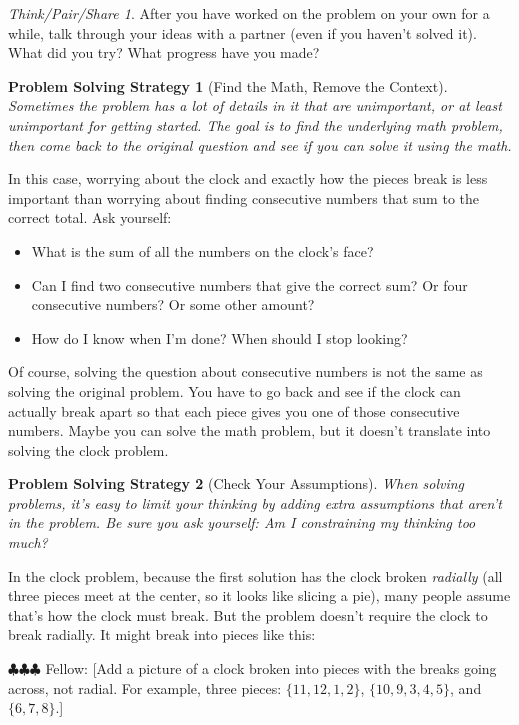 \documentclass[10pt, reqno]{amsart}
\newtheorem{ps}{Problem Solving Strategy}
\theoremstyle{remark}
\newtheorem*{thinkpair*}{Think/Pair/Share}
\theoremstyle{definition}
\numberwithin{equation}{section}  %
\newcommand{\fellow}[1]{{\color{magenta} \sf $\clubsuit\clubsuit\clubsuit$ Fellow: [#1]}}
\begin{document}
\begin{thinkpair*}
After you have worked on the problem on your own for a while, talk through your ideas with a partner (even if you haven't solved it).  What did you try?   What progress have you made?
\end{thinkpair*}


\begin{ps}[Find the Math, Remove the Context]
Sometimes the problem has a lot of details in it that are unimportant, or at least unimportant for getting started.  The goal is to find the underlying math problem, then come back to the original question and see if you can solve it using the math.
\end{ps}

In this case, worrying about the clock and exactly how the pieces break is less important than worrying about finding consecutive numbers that sum to the correct total.  Ask yourself: 
\begin{itemize}
\item
What is the sum of all the numbers on the clock's face?  
\item
Can I find two consecutive numbers that give the correct sum?  Or four consecutive numbers?  Or some other amount?
\item
How do I know when I'm done?  When should I stop looking?
\end{itemize}

Of course, solving the question about consecutive numbers is not the same as solving the original problem.  You have to go back and see if the clock can actually break apart so that each piece gives you one of those consecutive numbers.  Maybe you can solve the math problem, but it doesn't translate into solving the clock problem.

\begin{ps}[Check Your Assumptions]
When solving problems, it's easy to limit your thinking by adding extra assumptions that aren't in the problem.  Be sure you ask yourself: Am I constraining my thinking too much?
\end{ps}

In the clock problem, because the first solution has the clock broken \emph{radially} (all three pieces meet at the center, so it looks like slicing a pie), many people assume that's how the clock must break.  But the problem doesn't require the clock to break radially.  It might break into pieces like this:

\fellow{Add a picture of a clock broken into pieces with the breaks going across, not radial.  For example, three pieces: $\{11, 12, 1, 2\}$, $\{10,9, 3, 4, 5\}$, and $\{6,7,8\}$.}
\end{document}

